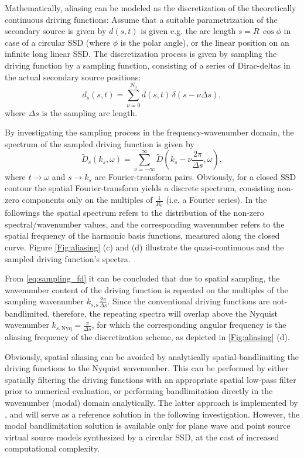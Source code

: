 \documentclass[conference]{IEEEtran}
\begin{document}
Mathematically, aliasing can be modeled as the discretization of the theoretically continuous driving functions:
Assume that a suitable parametrization of the secondary source is given by $d(s,t)$ is given e.g. the arc length $s = R\, \cos \phi$ in case of a circular SSD (where $\phi$ is the polar angle), or the linear position on an infinite long linear SSD.
The discretization process is given by sampling the driving function by a sampling function, consisting of a series of Dirac-deltas in the actual secondary source positions:
\begin{equation}
    d_s(s,t) = \sum_{\nu = 0}^{N_0} d(s,t) \, \delta(s - \nu \Delta s),
    \label{eq:sampling_td}
\end{equation}
where $\Delta s$ is the sampling arc length.

By investigating the sampling process in the frequency-wavenumber domain, the spectrum of the sampled driving function is given by
\begin{equation}
    \tilde{D}_s(k_s,\omega) = \sum_{\nu = -\infty}^{\infty} \tilde{D}(k_s- \nu \frac{2\pi}{\Delta s},\omega),
    \label{eq:sampling_fd}
\end{equation}
where $t \rightarrow \omega$ and $s \rightarrow k_s$ are Fourier-transform pairs.
Obviously, for a closed SSD contour the spatial Fourier-transform yields a discrete spectrum, consisting non-zero components only on the multiples of $\frac{1}{R_0}$ (i.e. a Fourier series).
In the followings the spatial spectrum refers to the distribution of the non-zero spectral/wavenumber values, and the corresponding wavenumber refers to the spatial frequency of the harmonic basis functions, measured along the closed curve.
Figure \ref{Fig:aliasing} (c) and (d) illustrate the quasi-continuous and the sampled driving function's spectra.

From \eqref{eq:sampling_fd} it can be concluded that due to spatial sampling, the wavenumber content of the driving function is repeated on the multiples of the sampling wavenumber $k_{s, \mathrm{s}} \frac{2\pi}{\Delta s}$.
Since the conventional driving functions are not-bandlimited, therefore, the repeating spectra will overlap above the Nyquist wavenumber $k_{s, \mathrm{Nyq}} = \frac{\pi}{\Delta s}$, for which the corresponding angular frequency is the aliasing frequency of the discretization scheme, as depicted in \ref{Fig:aliasing} (d).

Obviously, spatial aliasing can be avoided by analytically spatial-bandlimiting the driving functions to the Nyquist wavenumber.
This can be performed by either spatially filtering the driving functions with an appropriate spatial low-pass filter prior to numerical evaluation, or performing bandlimitation directly in the wavenumber (modal) domain analytically.
The latter approach is implemented by \cite{Nara and Fiete}, and will serve as a reference solution in the following investigation.
However, the modal bandlimitation solution is available only for plane wave and point source virtual source models synthesized by a circular SSD, at the cost of increased computational complexity.
\end{document}
